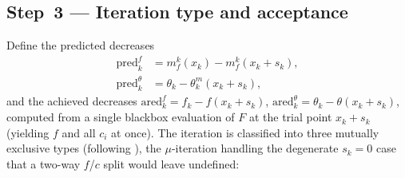 \subsection{Step~3 --- Iteration type and acceptance}
\label{sec:algo-accept}

Define the predicted decreases
\begin{align}
  \mathrm{pred}^f_k &= m_f^k(x_k) - m_f^k(x_k+s_k), \label{eq:predf}\\
  \mathrm{pred}^\theta_k &= \theta_k - \theta_k^m(x_k+s_k), \label{eq:predtheta}
\end{align}
and the achieved decreases $\mathrm{ared}^f_k=f_k-f(x_k+s_k)$,
$\mathrm{ared}^\theta_k=\theta_k-\theta(x_k+s_k)$, computed from a single blackbox
evaluation of $F$ at the trial point $x_k+s_k$ (yielding $f$ and all $c_i$ at
once). The iteration is classified into three mutually exclusive types
(following \citealp{GouldToint2010}), the $\mu$-iteration handling the degenerate
$s_k=0$ case that a two-way $f$/$c$ split would leave undefined:

